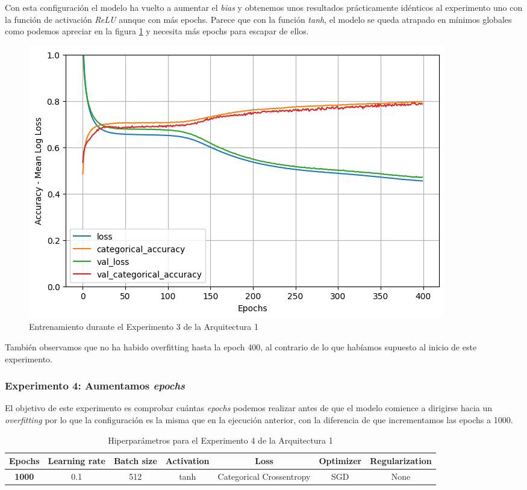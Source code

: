 \documentclass{article}
\begin{document}
			Con esta configuraci\'on el modelo ha vuelto a aumentar el \textit{bias} y obtenemos unos resultados pr\'acticamente id\'enticos al experimento uno con la funci\'on de activaci\'on \textit{ReLU} aunque con m\'as epochs. Parece que con la funci\'on \textit{tanh}, el modelo se queda atrapado en m\'inimos globales como podemos apreciar en la figura \ref{d-tr-a1-e3} y necesita m\'as epochs para escapar de ellos.\\
			
			\begin{figure}[!h]
				\begin{center}
					\includegraphics[scale=0.5]{d-tr-a1-e3.png}		
					\caption{Entrenamiento durante el Experimento 3 de la Arquitectura 1}	
					\label{d-tr-a1-e3}
				\end{center}
			\end{figure}
			
			Tambi\'en observamos que no ha habido overfitting hasta la epoch 400, al contrario de lo que hab\'iamos supuesto al inicio de este experimento.
			
		\subsubsection{Experimento 4: Aumentamos \textit{epochs}}
		\label{d-s-a1-e4}
			El objetivo de este experimento es comprobar cu\'antas \textit{epochs} podemos realizar antes de que el modelo comience a dirigirse hacia un \textit{overfitting} por lo que la configuraci\'on es la misma que en la ejecuci\'on anterior, con la diferencia de que incrementamos las epochs a 1000.
			\newpage
			\begin{table}[!h]
				\begin{center}
					\begin{tabular}{| c | c | c | c | c | c | c |}
						\textbf{Epochs} & \textbf{Learning rate} & \textbf{Batch size} & \textbf{Activation} & \textbf{Loss} & \textbf{Optimizer} & \textbf{Regularization} \\ \hline
						\textbf{1000} & 0.1 & 512 & tanh & Categorical Crossentropy & SGD & None
					\end{tabular}
					\caption{Hiperpar\'ametros para el Experimento 4 de la Arquitectura 1}
					\label{tab:hip-d-a1-e4}
				\end{center}
			\end{table}
			
\end{document}

